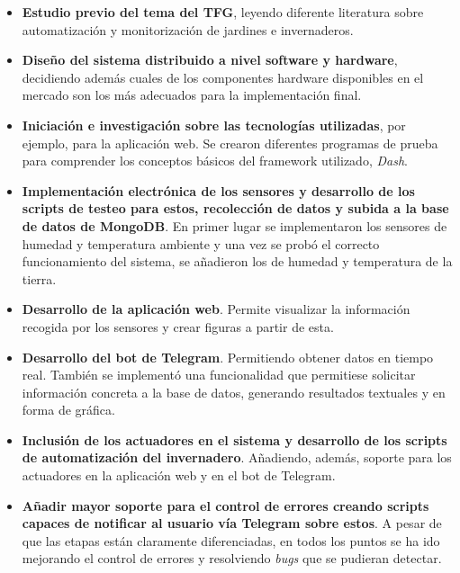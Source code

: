 \documentclass[a4paper, 12pt, oneside]{book}
\begin{document}
\begin{itemize}
\item \textbf{Estudio previo del tema del TFG}, leyendo diferente literatura sobre automatización y monitorización de jardines e invernaderos.

\item \textbf{Diseño del sistema distribuido a nivel software y hardware}, decidiendo además cuales de los componentes hardware disponibles en el mercado son los más adecuados para la implementación final.

\item \textbf{Iniciación e investigación sobre las tecnologías utilizadas}, por ejemplo, para la aplicación web. Se crearon diferentes programas de prueba para comprender los conceptos básicos del framework utilizado, \textit{Dash}.

\item \textbf{Implementación electrónica de los sensores y desarrollo de los scripts de testeo para estos, recolección de datos y subida a la base de datos de MongoDB}. En primer lugar se implementaron los sensores de humedad y temperatura ambiente y una vez se probó el correcto funcionamiento del sistema, se añadieron los de humedad y temperatura de la tierra.

\item \textbf{Desarrollo de la aplicación web}. Permite visualizar la información recogida por los sensores y crear figuras a partir de esta.

\item \textbf{Desarrollo del bot de Telegram}. Permitiendo obtener datos en tiempo real. También se implementó una funcionalidad que permitiese solicitar información concreta a la base de datos, generando resultados textuales y en forma de gráfica.

\item \textbf{Inclusión de los actuadores en el sistema y desarrollo de los scripts de automatización del invernadero}. Añadiendo, además, soporte para los actuadores en la aplicación web y en el bot de Telegram.

\item \textbf{Añadir mayor soporte para el control de errores creando scripts capaces de notificar al usuario vía Telegram sobre estos}. A pesar de que las etapas están claramente diferenciadas, en todos los puntos se ha ido mejorando el control de errores y resolviendo \textit{bugs} que se pudieran detectar. 

\end{itemize}
  
\end{document}
